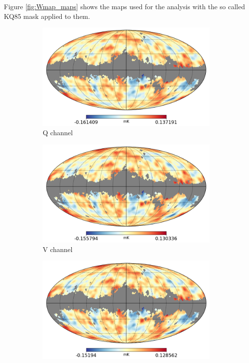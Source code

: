 \documentclass[openany,a4paper,12pt,oneside]{book}
\begin{document}
\begin{spacing}{1.5}
Figure \ref{fig:Wmap_maps} shows the maps used for the analysis with the so called KQ85 mask applied to them.

\begin{figure}[!htb]
     \centering
     \begin{subfigure}[b]{0.49\textwidth}
         \centering
         \includegraphics[width=\textwidth]{Imagens/wmap_Q_wmask.png}
         \caption{Q channel}
         \label{fig:Qchannel}
     \end{subfigure}
     \hfill
     \begin{subfigure}[b]{0.49\textwidth}
         \centering
         \includegraphics[width=\textwidth]{Imagens/wmap_V_wmask.png}
         \caption{V channel}
         \label{fig:Vchannel}
     \end{subfigure}
     \hfill
     \begin{subfigure}[b]{0.49\textwidth}
         \centering
         \includegraphics[width=\textwidth]{Imagens/wmap_W_wmask.png}

\end{subfigure}
\end{figure}
\end{spacing}
\end{document}
